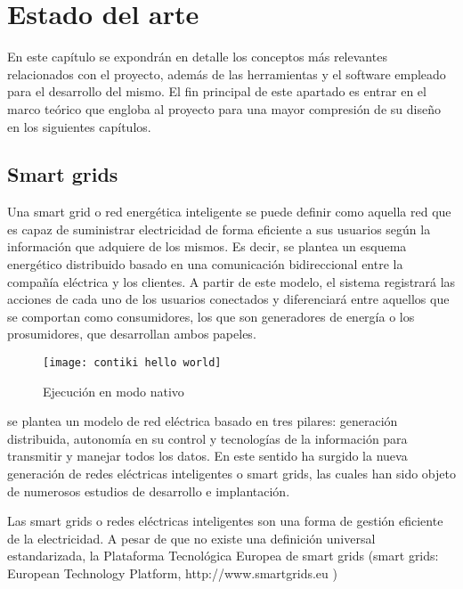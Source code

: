 
\chapter{Estado del arte}
\label{cha:estadoarte}

En este capítulo se expondrán en detalle los conceptos más relevantes relacionados con el proyecto, además de las  herramientas y el software empleado para el desarrollo del mismo. El fin principal de este apartado es entrar en el marco teórico que engloba al proyecto para una mayor compresión de su diseño en los siguientes capítulos.

\section{Smart grids}
Una smart grid o red energética inteligente se puede definir como aquella red que es capaz de suministrar electricidad de forma eficiente a sus usuarios según la información que adquiere de los mismos. Es decir, se plantea un esquema energético distribuido basado en una comunicación bidireccional entre la compañía eléctrica y los clientes. A partir de este modelo, el sistema registrará las acciones de cada uno de los usuarios conectados y diferenciará entre aquellos que se comportan como consumidores, los que son generadores de energía o los prosumidores, que desarrollan ambos papeles.



\begin{figure}[h!]
    \centering
    \texttt{[image: contiki hello world]}
    \caption{Ejecución en modo nativo}
    \label{fig:smart grids 1}
\end{figure}


se plantea un modelo de red eléctrica 
basado en tres pilares: generación distribuida, autonomía en su control y 
tecnologías de la información para transmitir y manejar todos los datos.
En este sentido ha surgido la nueva generación de redes eléctricas inteligentes 
o smart grids, las cuales han sido objeto de numerosos estudios de desarrollo e 
implantación.



Las smart grids o redes eléctricas inteligentes son una forma de gestión eficiente 
de la electricidad. A pesar de que no existe una definición universal 
estandarizada, la Plataforma Tecnológica Europea de smart grids (smart grids: 
European Technology Platform, http://www.smartgrids.eu )


